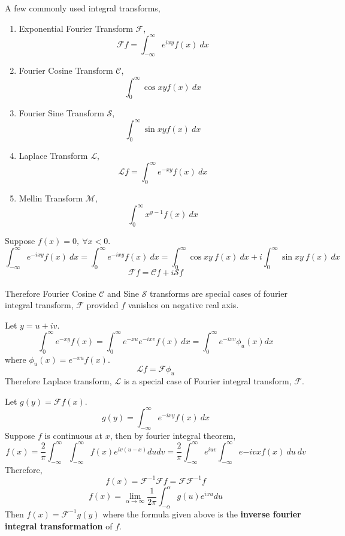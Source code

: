 \begin{remark} A few commonly used integral transforms,
\begin{enumerate}
	\item Exponential Fourier Transform $\mathscr{F}$,
		$$\mathscr{F}f = \int_{-\infty}^\infty e^{ixy}f(x)\ dx$$
	\item Fourier Cosine Transform $\mathscr{C}$,
		$$\int_0^\infty \cos xy f(x)\ dx$$
	\item Fourier Sine Transform $\mathscr{S}$,
		$$\int_0^\infty \sin xy f(x)\ dx$$
	\item Laplace Transform $\mathscr{L}$,
		$$\mathscr{L}f = \int_0^\infty e^{-xy} f(x)\ dx$$
	\item Mellin Transform $\mathscr{M}$,
		$$\int_0^\infty x^{y-1}f(x)\ dx$$
\end{enumerate}
\end{remark}

\begin{remark} Suppose $f(x) = 0,\ \forall x < 0$.
	$$\int_{-\infty}^\infty e^{-ixy}f(x)\ dx = \int_0^\infty e^{-ixy}f(x)\ dx = \int_0^\infty \cos xy \ f(x)\ dx + i \int_0^\infty \sin xy \ f(x)\ dx$$
	$$\mathscr{F}f = \mathscr{C}f + i\mathscr{S}f$$\\
	Therefore Fourier Cosine $\mathscr{C}$ and Sine $\mathscr{S}$ transforms are special cases of fourier integral transform, $\mathscr{F}$ provided $f$ vanishes on negative real axis.
\end{remark}

\begin{remark} Let $y = u+iv$.
	$$\int_0^\infty e^{-xy}f(x) = \int_0^\infty e^{-xu}e^{-ixv}f(x)\ dx = \int_0^\infty e^{-ixv} \phi_u(x) dx$$
	where $\phi_u(x) = e^{-xu}f(x)$.
	$$\mathscr{L}f = \mathscr{F}\phi_u$$
	Therefore Laplace transform, $\mathscr{L}$ is a special case of Fourier integral transform, $\mathscr{F}$.
\end{remark}

\begin{remark} Let $g(y) = \mathscr{F}f(x)$.
	$$g(y) = \int_{-\infty}^\infty e^{-ixy}f(x)\ dx$$
	Suppose $f$ is continuous at $x$, then by fourier integral theorem,
	$$f(x) = \frac{2}{\pi} \int_{-\infty}^\infty \int_{-\infty}^\infty f(x) e^{iv(u-x)} du dv = \frac{2}{\pi} \int_{-\infty}^\infty e^{iuv} \int_{-\infty}^\infty e{-ivx} f(x)\ du \ dv$$
	Therefore,
	$$f(x) = \mathscr{F}^{-1}\mathscr{F}f = \mathscr{F} \mathscr{F}^{-1}f$$
	$$f(x) = \lim_{\alpha \to \infty} \frac{1}{2\pi}\int_{-\alpha}^\alpha g(u) e^{ixu} du$$
	Then $f(x) = \mathscr{F}^{-1} g(y)$ where the formula given above is the \textbf{inverse fourier integral transformation} of $f$.
\end{remark}

